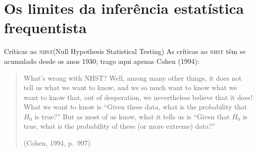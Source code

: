 \documentclass[numbering=fraction,aspectratio=169]{beamer}
\newcommand\NHST{\textsc{nhst}\xspace}
\begin{document}

\section{Os limites da inferência estatística frequentista}

\begin{frame}{Críticas ao \NHST (Null Hypothesis Statistical Testing)}
  As críticas ao \NHST têm se acumulado desde os anos 1930; trago aqui apenas Cohen (1994):
  \medskip

  \begin{quote}
    What's wrong with NHST? Well, among many other things, \alert{it does not tell us what we want to know}, and we so much want to know what we want to know that, out of desperation, we nevertheless believe that it does! What we want to know is “Given these data, what is the probability that $H_0$ is true?” But as most of us know, what it tells us is \pause \alert{“Given that $H_0$ is true, what is the probability of these (or more extreme) data?”}

    \raggedleft
    (Cohen, 1994, p.~997)
  \end{quote}
\end{frame}
\end{document}
